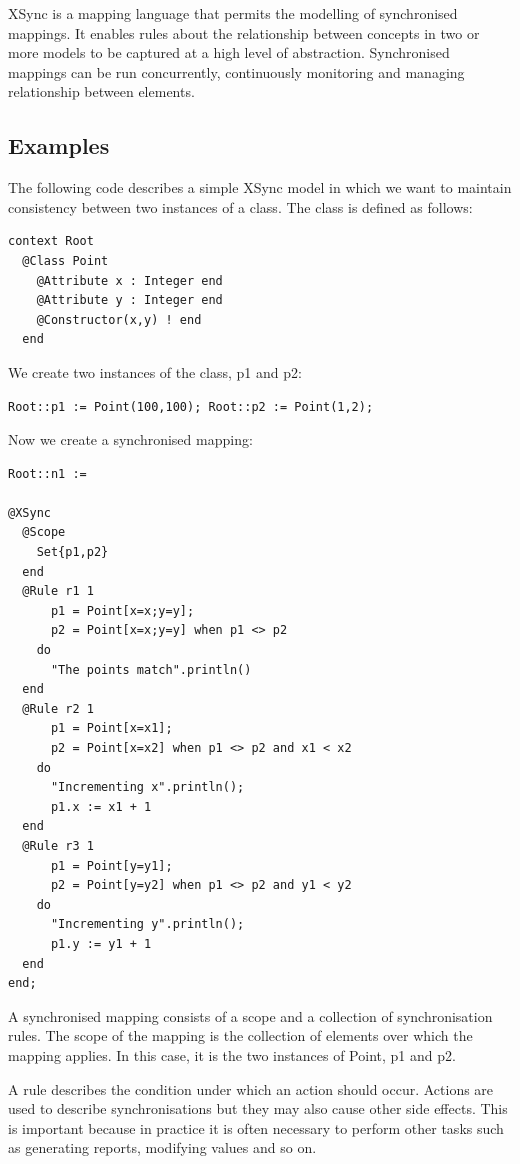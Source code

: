 XSync is a mapping language that permits the modelling of
synchronised mappings. It enables rules about the relationship
between concepts in two or more models to be captured at a high
level of abstraction. Synchronised mappings can be run
concurrently, continuously monitoring and managing relationship
between elements.

\subsection{Examples}

The following code describes a simple XSync model in which we want
to maintain consistency between two instances of a class. The
class is defined as follows:

\begin{lstlisting}
context Root
  @Class Point
    @Attribute x : Integer end
    @Attribute y : Integer end
    @Constructor(x,y) ! end
  end
\end{lstlisting}\noindent We create two instances of the class, p1 and p2:

\begin{lstlisting}
Root::p1 := Point(100,100); Root::p2 := Point(1,2);
\end{lstlisting}\noindent Now we create a synchronised mapping:

\begin{lstlisting}
Root::n1 :=

@XSync
  @Scope
    Set{p1,p2}
  end
  @Rule r1 1
      p1 = Point[x=x;y=y];
      p2 = Point[x=x;y=y] when p1 <> p2
    do
      "The points match".println()
  end
  @Rule r2 1
      p1 = Point[x=x1];
      p2 = Point[x=x2] when p1 <> p2 and x1 < x2
    do
      "Incrementing x".println();
      p1.x := x1 + 1
  end
  @Rule r3 1
      p1 = Point[y=y1];
      p2 = Point[y=y2] when p1 <> p2 and y1 < y2
    do
      "Incrementing y".println();
      p1.y := y1 + 1
  end
end;
\end{lstlisting}A synchronised mapping consists of a scope and a collection of
synchronisation rules. The scope of the mapping is the collection
of elements over which the mapping applies. In this case, it is
the two instances of Point, p1 and p2.

A rule describes the condition under which an action should occur.
Actions are used to describe synchronisations but they may also
cause other side effects. This is important because in practice it
is often necessary to perform other tasks such as generating
reports, modifying values and so on.

